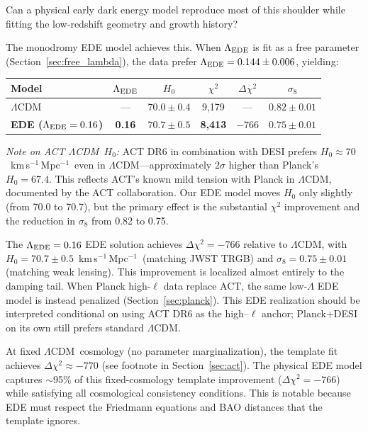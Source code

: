 \documentclass[onecolumn,showpacs,preprintnumbers,amsmath,amssymb,prd]{revtex4-2}
\newcommand{\lcdm}{$\Lambda$CDM}
\newcommand{\kms}{km\,s$^{-1}$\,Mpc$^{-1}$}
\begin{document}
Can a physical early dark energy model reproduce most of this shoulder 
while fitting the low-redshift geometry and growth history?

The monodromy EDE model achieves this. When $\Lambda_{\rm EDE}$ is fit 
as a free parameter (Section~\ref{sec:free_lambda}), the data prefer 
$\Lambda_{\rm EDE} = 0.144 \pm 0.006$, yielding:
\begin{center}
\begin{tabular}{lccccc}
\toprule
Model & $\Lambda_{\rm EDE}$ & $H_0$ & $\chi^2$ & $\Delta\chi^2$ & $\sigma_8$ \\
\midrule
\lcdm & --- & $70.0 \pm 0.4$ & 9{,}179 & --- & $0.82 \pm 0.01$ \\
\textbf{EDE ($\Lambda_{\rm EDE} = 0.16$)} & \textbf{0.16} & $\mathbf{70.7 \pm 0.5}$ & \textbf{8{,}413} & \textbf{$-766$} & $\mathbf{0.75 \pm 0.01}$ \\
\bottomrule
\end{tabular}
\end{center}

\emph{Note on ACT \lcdm\ $H_0$:} ACT DR6 in combination with DESI prefers 
$H_0 \approx 70$~\kms\ even in \lcdm---approximately 2$\sigma$ higher than Planck's 
$H_0 = 67.4$. This reflects ACT's known mild tension with Planck in \lcdm, 
documented by the ACT collaboration. Our EDE model moves $H_0$ only slightly 
(from 70.0 to 70.7), but the primary effect is the substantial $\chi^2$ improvement 
and the reduction in $\sigma_8$ from 0.82 to 0.75.

The $\Lambda_{\rm EDE} = 0.16$ EDE solution achieves $\Delta\chi^2 = -766$ relative to \lcdm, 
with $H_0 = 70.7 \pm 0.5$~\kms\ (matching JWST TRGB) and $\sigma_8 = 0.75 \pm 0.01$ 
(matching weak lensing). This improvement is localized almost entirely to the damping tail. When 
Planck high-$\ell$ data replace ACT, the same low-$\Lambda$ EDE model is instead 
penalized (Section~\ref{sec:planck}). This EDE realization should be interpreted 
conditional on using ACT DR6 as the high--$\ell$ anchor; Planck+DESI on its own 
still prefers standard $\Lambda$CDM.

At fixed \lcdm\ cosmology (no parameter marginalization), the template fit 
achieves $\Delta\chi^2 \approx -770$ (see footnote in Section~\ref{sec:act}). 
The physical EDE model captures $\sim$95\% of this fixed-cosmology template 
improvement ($\Delta\chi^2 = -766$) while satisfying all cosmological consistency 
conditions. This is notable because EDE must respect the Friedmann 
equations and BAO distances that the template ignores.
\end{document}
